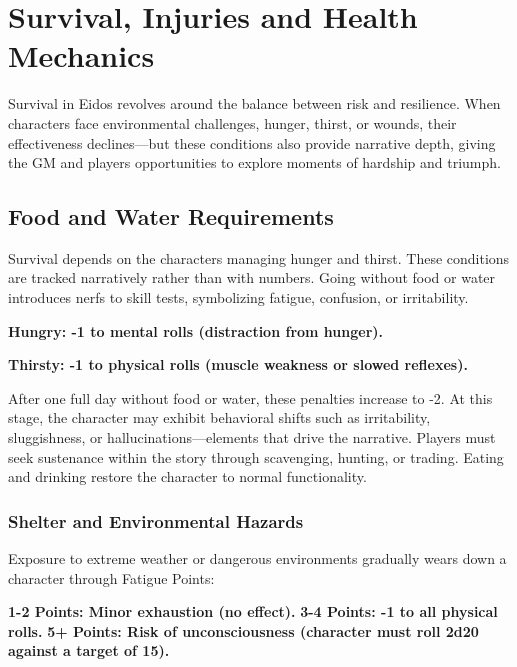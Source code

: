 \hypertarget{survival-injuries-and-health-mechanics}{%
\section{Survival, Injuries and Health
Mechanics}\label{survival-injuries-and-health-mechanics}}

Survival in Eidos revolves around the balance between risk and
resilience. When characters face environmental challenges, hunger,
thirst, or wounds, their effectiveness declines---but these conditions
also provide narrative depth, giving the GM and players opportunities to
explore moments of hardship and triumph.

\hypertarget{food-and-water-requirements}{%
\subsection{Food and Water
Requirements}\label{food-and-water-requirements}}

Survival depends on the characters managing hunger and thirst. These
conditions are tracked narratively rather than with numbers. Going
without food or water introduces nerfs to skill tests, symbolizing
fatigue, confusion, or irritability.

\textbf{Hungry: -1 to mental rolls (distraction from hunger).}

\textbf{Thirsty: -1 to physical rolls (muscle weakness or slowed
reflexes).}

After one full day without food or water, these penalties increase to
-2. At this stage, the character may exhibit behavioral shifts such as
irritability, sluggishness, or hallucinations---elements that drive the
narrative. Players must seek sustenance within the story through
scavenging, hunting, or trading. Eating and drinking restore the
character to normal functionality.

\hypertarget{shelter-and-environmental-hazards}{%
\subsubsection{Shelter and Environmental
Hazards}\label{shelter-and-environmental-hazards}}

Exposure to extreme weather or dangerous environments gradually wears
down a character through Fatigue Points:

\textbf{1-2 Points: Minor exhaustion (no effect).} \textbf{3-4 Points:
-1 to all physical rolls.} \textbf{5+ Points: Risk of unconsciousness
(character must roll 2d20 against a target of 15).}


